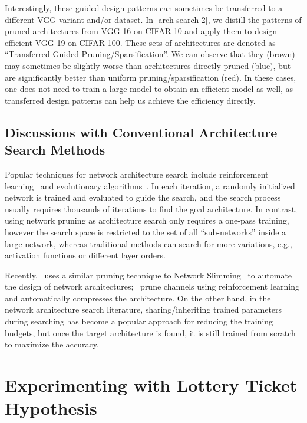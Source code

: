 Interestingly, these guided design patterns can sometimes be transferred to a different VGG-variant and/or dataset. In \autoref{arch-search-2}, we distill the patterns of pruned architectures from VGG-16 on CIFAR-10 and apply them to design efficient VGG-19 on CIFAR-100. These sets of architectures are denoted as ``Transferred Guided Pruning/Sparsification''. We can observe that they (brown) may sometimes be slightly worse than architectures directly pruned (blue), but are significantly better than uniform pruning/sparsification (red). In these cases, one does not need to train a large model  to obtain an efficient model as well, as transferred design patterns can help us achieve the efficiency directly. 


\subsection{Discussions with Conventional Architecture Search Methods} 
Popular techniques for network architecture search include reinforcement learning~\cite{rl1, rl2} and evolutionary algorithms~\cite{genetic,liu2017hierarchical}. In each iteration, a randomly initialized network is trained and evaluated to guide the search, and the search process usually requires thousands of iterations to find the goal architecture. In contrast, using network pruning as architecture search  only requires a one-pass training, however the search space is restricted to the set of all ``sub-networks'' inside a large network, whereas traditional methods can search for more variations, e.g., activation functions or different layer orders.

Recently,~\cite{gordon2018morphnet} uses a similar pruning technique to Network Slimming~\cite{liu2017learning} to automate the design of network architectures;~\cite{amc} prune channels using reinforcement learning and automatically compresses the architecture. On the other hand, in the network architecture search literature, sharing/inheriting trained parameters~\cite{sharing,darts} during searching has become a popular approach for  reducing the training budgets, but once the target architecture is found, it is still trained from scratch to maximize the accuracy. 

\section{Experimenting with Lottery Ticket Hypothesis}
\label{ap:lottery}


